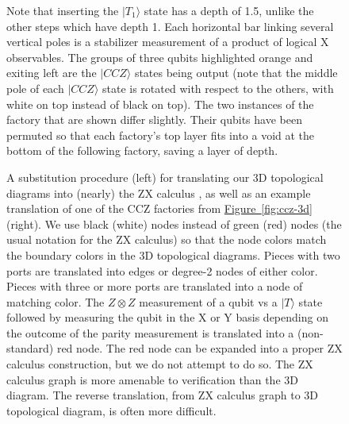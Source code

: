 \documentclass[twocolumn,accepted=2019-03-30]{quantumarticle}
\newcommand{\fig}[1]{\hyperref[fig:#1]{Figure~\ref*{fig:#1}}}
\begin{document}
\begin{figure}
{    Note that inserting the $|T_1\rangle$ state has a depth of 1.5, unlike the other steps which have depth 1.
    Each horizontal bar linking several vertical poles is a stabilizer measurement of a product of logical X observables.
    The groups of three qubits highlighted orange and exiting left are the $|CCZ\rangle$ states being output (note that the middle pole of each $|CCZ\rangle$ state is rotated with respect to the others, with white on top instead of black on top).
    The two instances of the factory that are shown differ slightly.
    Their qubits have been permuted so that each factory's top layer fits into a void at the bottom of the following factory, saving a layer of depth.
  }
\end{figure}

\begin{figure}
  \label{fig:ccz-graph}
  \caption{
    A substitution procedure (left) for translating our 3D topological diagrams into (nearly) the ZX calculus \cite{de2017}, as well as an example translation of one of the CCZ factories from \fig{ccz-3d} (right).
    We use black (white) nodes instead of green (red) nodes (the usual notation for the ZX calculus) so that the node colors match the boundary colors in the 3D topological diagrams.
    Pieces with two ports are translated into edges or degree-2 nodes of either color.
    Pieces with three or more ports are translated into a node of matching color.
    The $Z \otimes Z$ measurement of a qubit vs a $|T\rangle$ state followed by measuring the qubit in the X or Y basis depending on the outcome of the parity measurement is translated into a (non-standard) red node.
    The red node can be expanded into a proper ZX calculus construction, but we do not attempt to do so.
    The ZX calculus graph is more amenable to verification than the 3D diagram.
    The reverse translation, from ZX calculus graph to 3D topological diagram, is often more difficult.
  }
\end{figure}
\end{document}

